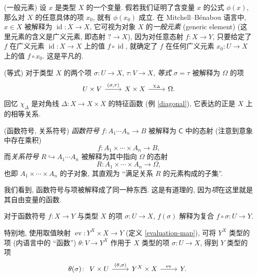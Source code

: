 \begin{remark}
	{(一般元素)}
	设 $x$ 是类型 $X$ 的一个变量.
	假若我们证明了含变量 $x$ 的公式 $\phi(x)$,
	那么对 $X$ 的任意具体的项 $x_0$, 就有 $\phi(x_0)$ 成立.
	在 Mitchell--B\'enabou 语言中, $x\in X$ 被解释为 $\operatorname{id}\colon X\to X$, 它可视为对象 $X$ 的\emph{一般元素} (generic element) (这里元素的含义是广义元素, 即态射 $?\to X$), 因为对任意态射 $f\colon X\to Y$, 只要给定了 $f$ 在广义元素 $\operatorname{id}\colon X\to X$ 上的值 $f\circ\operatorname{id}$, 就确定了 $f$ 在任何广义元素 $x_0\colon U\to X$ 上的值 $f\circ x_0$. 这是平凡的.
\end{remark}

\begin{definition}
	{(等式)}
	对于类型 $X$ 的两个项 $\sigma\colon U \to X$, $\tau\colon V \to X$, \emph{等式} $\sigma = \tau$ 被解释为 $\Omega$ 的项
	\[\begin{tikzcd}[ampersand replacement=\&]
		{U\times V} \& {X\times X} \& \Omega.
		\arrow["{(\sigma,\tau)}", from=1-1, to=1-2]
		\arrow["{\chi_{\Delta}}", from=1-2, to=1-3]
	\end{tikzcd}\]
	回忆 $\chi_{\Delta}$ 是对角线 $\Delta\colon X\to X\times X$ 的特征函数 (例 \ref{diagonal}), 它表达的正是 $X$ 上的相等关系.
\end{definition}

\begin{definition}
	{(函数符号, 关系符号)}
	\emph{函数符号} $f\colon A_1\cdots A_n \to B$ 被解释为 $\mathsf C$ 中的态射 (注意到意象中存在乘积)
	$$f\colon A_1\times\cdots\times A_n\to B,$$
	而\emph{关系符号} $R\hookrightarrow A_1\cdots A_n$ 被解释为其中指向 $\Omega$ 的态射
	$$
	R\colon A_1\times\cdots\times A_n \to \Omega,
	$$
	也即 $A_1\times\cdots\times A_n$ 的子对象, 其直观为 ``满足关系 $R$ 的元素构成的子集''.
	
	我们看到, 函数符号与项被解释成了同一种东西. 这是有道理的, 因为\emph{项}在这里就是其自由变量的函数.
	
	对于函数符号 $f\colon X \to Y$ 与类型 $X$ 的项 $\sigma\colon U \to X$, $f(\sigma)$ 解释为复合 $f\circ\sigma \colon U \to Y$.
\end{definition}

特别地, 使用取值映射 $\operatorname{ev}\colon Y^X\times X\to Y$ (定义 \ref{evaluation-map}),
可将 $Y^X$ 类型的项 (内语言中的 ``函数'') $\theta\colon V\to Y^X$
作用于 $X$ 类型的项 $\sigma \colon U \to X$,
得到 $Y$ 类型的项
\[\theta(\sigma)\colon
\begin{tikzcd}[ampersand replacement=\&]
	{V\times U} \& {Y^X\times X} \& Y.
	\arrow["{(\theta,\sigma)}", from=1-1, to=1-2]
	\arrow["{\operatorname{ev}}", from=1-2, to=1-3]
\end{tikzcd}\]

